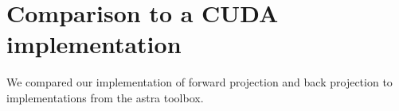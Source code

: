 \section{Comparison to a CUDA implementation}
We compared our implementation of forward projection and back projection to implementations from the astra toolbox.
